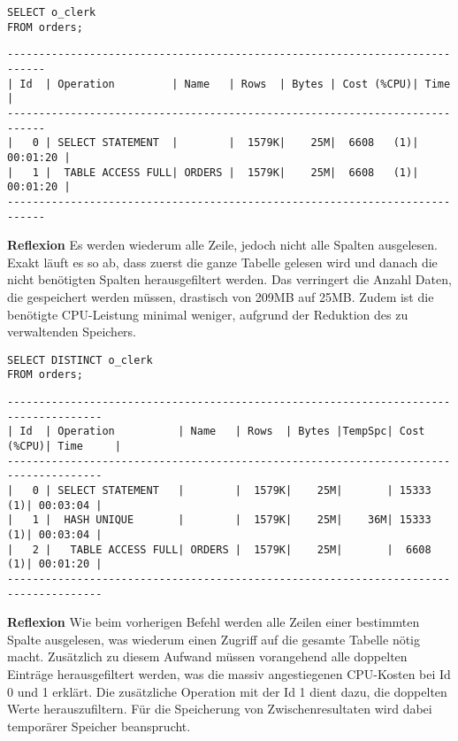 \documentclass[10pt]{article}
\begin{document}
\begin{lstlisting}[style=sql]
SELECT o_clerk
FROM orders;
\end{lstlisting}
\begin{lstlisting}[style=queryexecutionplan]
----------------------------------------------------------------------------
| Id  | Operation         | Name   | Rows  | Bytes | Cost (%CPU)| Time     |
----------------------------------------------------------------------------
|   0 | SELECT STATEMENT  |        |  1579K|    25M|  6608   (1)| 00:01:20 |
|   1 |  TABLE ACCESS FULL| ORDERS |  1579K|    25M|  6608   (1)| 00:01:20 |
---------------------------------------------------------------------------- 
\end{lstlisting}   
\textbf{Reflexion} \newline
Es werden wiederum alle Zeile, jedoch nicht alle Spalten ausgelesen.
Exakt läuft es so ab, dass zuerst die ganze Tabelle gelesen wird und danach die nicht
benötigten Spalten herausgefiltert werden.
Das verringert die Anzahl Daten, die gespeichert werden müssen, drastisch von 209MB auf 25MB.
Zudem ist die benötigte CPU-Leistung minimal weniger, aufgrund der Reduktion des
zu verwaltenden Speichers.

\begin{lstlisting}[style=sql]
SELECT DISTINCT o_clerk
FROM orders;
\end{lstlisting}
\begin{lstlisting}[style=queryexecutionplan]
-------------------------------------------------------------------------------------
| Id  | Operation          | Name   | Rows  | Bytes |TempSpc| Cost (%CPU)| Time     |
-------------------------------------------------------------------------------------
|   0 | SELECT STATEMENT   |        |  1579K|    25M|       | 15333   (1)| 00:03:04 |
|   1 |  HASH UNIQUE       |        |  1579K|    25M|    36M| 15333   (1)| 00:03:04 |
|   2 |   TABLE ACCESS FULL| ORDERS |  1579K|    25M|       |  6608   (1)| 00:01:20 |
-------------------------------------------------------------------------------------
\end{lstlisting} 
\textbf{Reflexion} \newline
Wie beim vorherigen Befehl werden alle Zeilen einer bestimmten Spalte ausgelesen,
was wiederum einen Zugriff auf die gesamte Tabelle nötig macht.
Zusätzlich zu diesem Aufwand müssen vorangehend alle doppelten Einträge herausgefiltert werden,
was die massiv angestiegenen CPU-Kosten bei Id 0 und 1 erklärt.
Die zusätzliche Operation mit der Id 1 dient dazu, die doppelten Werte herauszufiltern.
Für die Speicherung von Zwischenresultaten wird dabei temporärer Speicher beansprucht.
\end{document}
